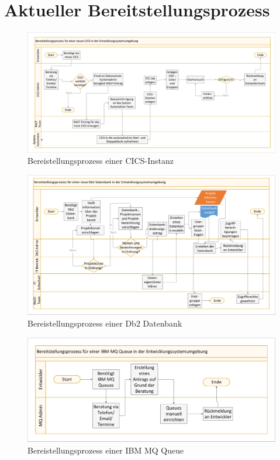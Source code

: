 \section{Aktueller Bereitstellungsprozess}
 \begin{figure}[ht!]
\centering
\includegraphics[width=\paperwidth,angle=90]{figures/swimlaneCICS.pdf}
\caption{Bereistellungsprozess einer CICS-Instanz}
\label{fig:aktcics}
\end{figure}

\begin{figure}[ht!]
\centering
\includegraphics[width=\paperwidth,angle=90]{figures/swimlaneDb2.pdf}
\caption{Bereistellungsprozess einer Db2 Datenbank}
\label{fig:aktdb2}
\end{figure}

\begin{figure}[ht!]
\centering
\includegraphics[width=\paperwidth,angle=90]{figures/swimlaneMQ.pdf}
\caption{Bereistellungsprozess einer IBM MQ Queue}
\label{fig:aktmq}
\end{figure}

